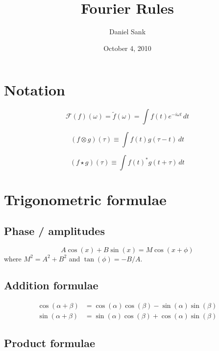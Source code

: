 \documentclass{article}
\author{Daniel Sank}
\title{Fourier Rules}
\date{October 4, 2010}
\begin{document}
\maketitle
\tableofcontents

\section{Notation}

\begin{equation*}
  \mathcal{F}(f)(\omega) = \tilde{f}(\omega) = \int f(t) e^{-i \omega t} \, dt
\end{equation*}

\begin{equation*}
  (f \otimes g)(\tau) \equiv \int f(t) g(\tau - t) \, dt
\end{equation*}

\begin{equation*}
  (f \star g)(\tau) \equiv \int f(t)^* g(t + \tau) \, dt
\end{equation*}

\section{Trigonometric formulae}

\subsection*{Phase / amplitudes}
\begin{equation}
  A \cos(x) + B \sin(x) = M \cos(x+\phi)
\end{equation}
where $M^{2} = A^{2}+B^{2}$ and $\tan(\phi) = -B / A$.

\subsection*{Addition formulae}

\begin{align*}
  \cos ( \alpha + \beta ) & =
    \cos ( \alpha ) \cos ( \beta ) - \sin ( \alpha ) \sin ( \beta ) \\
  \sin ( \alpha + \beta ) & =
    \sin ( \alpha ) \cos ( \beta ) + \cos ( \alpha ) \sin ( \beta )
\end{align*}

\subsection*{Product formulae}
\end{document}
